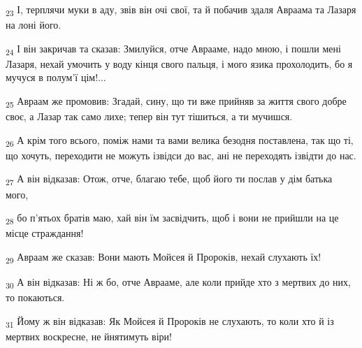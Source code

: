\begin{tcolorbox}
\textsubscript{23} І, терплячи муки в аду, звів він очі свої, та й побачив здаля Авраама та Лазаря на лоні його.
\end{tcolorbox}
\begin{tcolorbox}
\textsubscript{24} І він закричав та сказав: Змилуйся, отче Аврааме, надо мною, і пошли мені Лазаря, нехай умочить у воду кінця свого пальця, і мого язика прохолодить, бо я мучуся в полум'ї цім!...
\end{tcolorbox}
\begin{tcolorbox}
\textsubscript{25} Авраам же промовив: Згадай, сину, що ти вже прийняв за життя свого добре своє, а Лазар так само лихе; тепер він тут тішиться, а ти мучишся.
\end{tcolorbox}
\begin{tcolorbox}
\textsubscript{26} А крім того всього, поміж нами та вами велика безодня поставлена, так що ті, що хочуть, переходити не можуть ізвідси до вас, ані не переходять ізвідти до нас.
\end{tcolorbox}
\begin{tcolorbox}
\textsubscript{27} А він відказав: Отож, отче, благаю тебе, щоб його ти послав у дім батька мого,
\end{tcolorbox}
\begin{tcolorbox}
\textsubscript{28} бо п'ятьох братів маю, хай він їм засвідчить, щоб і вони не прийшли на це місце страждання!
\end{tcolorbox}
\begin{tcolorbox}
\textsubscript{29} Авраам же сказав: Вони мають Мойсея й Пророків, нехай слухають їх!
\end{tcolorbox}
\begin{tcolorbox}
\textsubscript{30} А він відказав: Ні ж бо, отче Аврааме, але коли прийде хто з мертвих до них, то покаються.
\end{tcolorbox}
\begin{tcolorbox}
\textsubscript{31} Йому ж він відказав: Як Мойсея й Пророків не слухають, то коли хто й із мертвих воскресне, не йнятимуть віри!
\end{tcolorbox}
